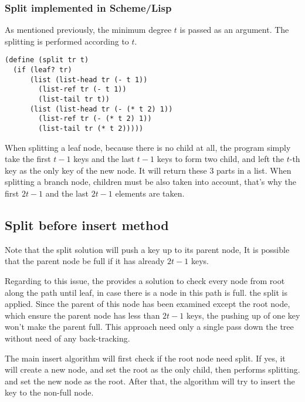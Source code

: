 \documentclass{article}
\begin{document}
\subsubsection*{Split implemented in Scheme/Lisp}
As mentioned previously, the minimum degree $t$ is passed as an argument.
The splitting is performed according to $t$.

\lstset{language=lisp}
\begin{lstlisting}
(define (split tr t)
  (if (leaf? tr)
      (list (list-head tr (- t 1))
	    (list-ref tr (- t 1))
	    (list-tail tr t))
      (list (list-head tr (- (* t 2) 1))
	    (list-ref tr (- (* t 2) 1))
	    (list-tail tr (* t 2)))))
\end{lstlisting}

When splitting a leaf node, because there is no child at all, the
program simply take the first $t-1$ keys and the last $t-1$ keys
to form two child, and left the $t$-th key as the only key of the
new node. It will return these 3 parts in a list. When splitting
a branch node, children must be also taken into account, that's
why the first $2t-1$ and the last $2t-1$ elements are taken.

\subsection{Split before insert method}
\label{split before insertion}

Note that the split solution will push a key up to its parent node,
It is possible that the parent node be full if it has already
$2t-1$ keys.

Regarding to this issue, the \cite{CLRS} provides a solution to check
every node from root along the path until leaf, in case there is a
node in this path is full. the split is applied. Since the parent
of this node has been examined except the root node, which ensure
the parent node has less than $2t-1$ keys, the pushing up of one
key won't make the parent full. This approach need only a single
pass down the tree without need of any back-tracking.

The main insert algorithm will first check if the root node need
split. If yes, it will create a new node, and set the root as the
only child, then performs splitting. and set the new node as the
root. After that, the algorithm will try to insert the key to the
non-full node.
\end{document}
